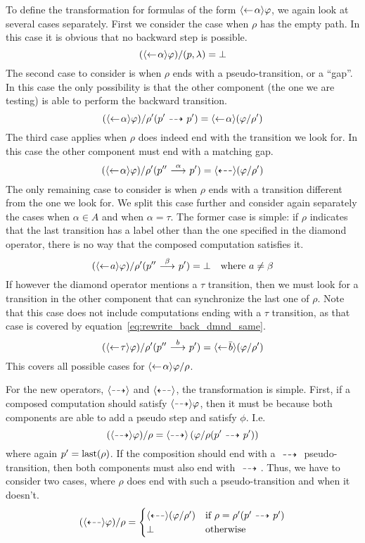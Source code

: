 To define the transformation for formulas of the form $\mbox{\ensuremath{\langle\leftarrow\! \alpha \rangle}}\varphi$, we
again look at several cases separately. First we consider the case when $\rho$ has
the empty path. In this case it is obvious that no backward step is possible.
\[
    (\mbox{\ensuremath{\langle\leftarrow\! \alpha \rangle}}\varphi) / (p,\lambda) = \bot
\]
The second case to consider is when $\rho$ ends with a pseudo-transition, or a ``gap''.
In this case the only possibility is that the other component (the one we are testing)
is able to perform the backward transition.
\[
    (\mbox{\ensuremath{\langle\leftarrow\! \alpha \rangle}}\varphi) / \rho'(p'\ {\stackrel{_{}}{\dashrightarrow}}\  p') =
        \mbox{\ensuremath{\langle\leftarrow\! \alpha \rangle}} (\varphi / \rho')
\]
The third case applies when $\rho$ does indeed end with the transition we look for.
In this case the other component must end with a matching gap.
\begin{equation}\label{eq:rewrite_back_dmnd_same}
    (\mbox{\ensuremath{\langle\leftarrow\! \alpha \rangle}}\varphi) / \rho'(p''\ {\stackrel{{\alpha}}{\longrightarrow}}\  p') = \mbox{\ensuremath{\langle\stackrel{_{}}{\dashleftarrow}\rangle}} (\varphi / \rho')
\end{equation}
The only remaining case to consider is when $\rho$ ends with a transition different from
the one we look for. We split this case further and consider
again separately the cases when $\alpha\in A$ and when $\alpha = \tau$. The former case
is simple: if $\rho$ indicates that the last transition has a label other than the one
specified
in the diamond operator, there is no way that the composed computation satisfies it.
\[
    (\mbox{\ensuremath{\langle\leftarrow\! a \rangle}}\varphi) / \rho'(p'' \ {\stackrel{{\beta}}{\longrightarrow}}\  p') = \bot \quad\textrm{where $a\ne \beta$}
\]
If however the diamond operator mentions a $\tau$ transition, then we must look for a
transition in the other component that can synchronize the last one of $\rho$. Note that this
case does not include computations ending with a $\tau$ transition, as that case is
covered by equation~\ref{eq:rewrite_back_dmnd_same}.
\[
    (\mbox{\ensuremath{\langle\leftarrow\! \tau \rangle}}\varphi) / \rho'(p'' \ {\stackrel{{b}}{\longrightarrow}}\  p') = \mbox{\ensuremath{\langle\leftarrow\! \bar{b} \rangle}} (\varphi/\rho')
\]
This covers all possible cases for $\mbox{\ensuremath{\langle\leftarrow\! \alpha \rangle}}\varphi / \rho$.

For the new operators, $\mbox{\ensuremath{\langle\stackrel{_{}}{\dashrightarrow}\rangle}}$ and $\mbox{\ensuremath{\langle\stackrel{_{}}{\dashleftarrow}\rangle}}$, the transformation is simple.
First, if a composed computation should satisfy $\mbox{\ensuremath{\langle\stackrel{_{}}{\dashrightarrow}\rangle}}\varphi$, then it must be
because both components are able to add a pseudo step and satisfy $\phi$. I.e.
\[
    (\mbox{\ensuremath{\langle\stackrel{_{}}{\dashrightarrow}\rangle}}\varphi) / \rho = \mbox{\ensuremath{\langle\stackrel{_{}}{\dashrightarrow}\rangle}} \left( \varphi / \rho(p'\ {\stackrel{_{}}{\dashrightarrow}}\  p') \right)
\]
where again $p' = \operatorname{last}(\rho)$. If the composition should end with a $\ {\stackrel{_{}}{\dashrightarrow}}\ $
pseudo-transition, then both components must also end with $\ {\stackrel{_{}}{\dashrightarrow}}\ $. Thus, we
have to consider two cases, where $\rho$ does end with such a pseudo-transition
and when it doesn't.
\[
    (\mbox{\ensuremath{\langle\stackrel{_{}}{\dashleftarrow}\rangle}}\varphi) / \rho = \begin{cases}
        \mbox{\ensuremath{\langle\stackrel{_{}}{\dashleftarrow}\rangle}} (\varphi / \rho') & \textrm{if $\rho = \rho'(p' \ {\stackrel{_{}}{\dashrightarrow}}\  p')$} \\
        \bot & \textrm{otherwise}
    \end{cases}
\]

